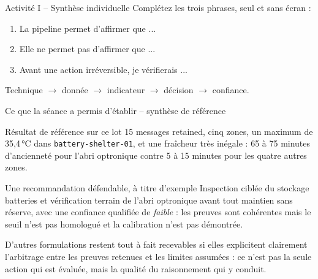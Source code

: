 \documentclass[aspectratio=169]{beamer}
\begin{document}
\begin{frame}{Activité I -- Synthèse individuelle}
  Complétez les trois phrases, seul et sans écran :
  \begin{enumerate}
    \item La pipeline permet d'affirmer que ...
    \item Elle ne permet pas d'affirmer que ...
    \item Avant une action irréversible, je vérifierais ...
  \end{enumerate}
  \vfill
  \alert{Technique $\rightarrow$ donnée $\rightarrow$ indicateur $\rightarrow$ décision $\rightarrow$ confiance.}
\end{frame}

\begin{frame}{Ce que la séance a permis d'établir -- synthèse de référence}
  \small
  \begin{block}{Résultat de référence sur ce lot}
    15 messages retained, cinq zones, un maximum de 35,4\,°C dans \texttt{battery-shelter-01}, et une fraîcheur très inégale : 65 à 75 minutes d'ancienneté pour l'abri optronique contre 5 à 15 minutes pour les quatre autres zones.
  \end{block}
  \begin{block}{Une recommandation défendable, à titre d'exemple}
    Inspection ciblée du stockage batteries et vérification terrain de l'abri optronique avant tout maintien sans réserve, avec une confiance qualifiée de \emph{faible} : les preuves sont cohérentes mais le seuil n'est pas homologué et la calibration n'est pas démontrée.
  \end{block}
  \normalsize
  \alert{D'autres formulations restent tout à fait recevables si elles explicitent clairement l'arbitrage entre les preuves retenues et les limites assumées : ce n'est pas la seule action qui est évaluée, mais la qualité du raisonnement qui y conduit.}
\end{frame}
\end{document}
